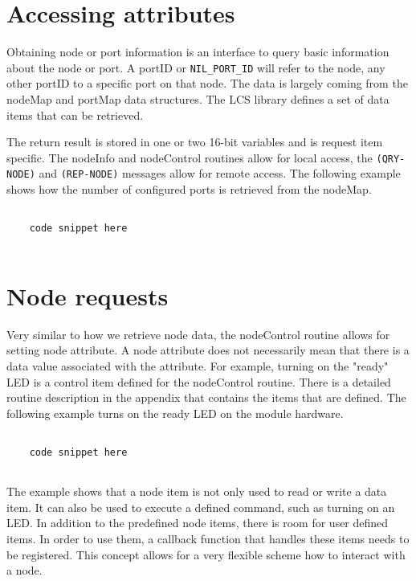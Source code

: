 \section{Accessing attributes}

Obtaining node or port information is an interface to query basic information about the node or port. A portID or \texttt{NIL\_PORT\_ID} will refer to the node, any other portID to a specific port on that node. The data is largely coming from the nodeMap and portMap data structures. The LCS library defines a set of data items that can be retrieved. 

The return result is stored in one or two 16-bit variables and is request item specific. The nodeInfo and nodeControl routines allow for local access, the \texttt{(QRY-NODE)} and \texttt{(REP-NODE)} messages allow for remote access. The following example shows how the number of configured ports is retrieved from the nodeMap.


\lstset{language=c++, style=codesnippetstyle}
\begin{lstlisting}
   
    code snippet here
    
\end{lstlisting}
\FloatBarrier

\section{Node requests}

Very similar to how we retrieve node data, the nodeControl routine allows for setting node attribute. A node attribute does not necessarily mean that there is a data value associated with the attribute. For example, turning on the "ready" LED is a control item defined for the nodeControl routine. There is a detailed routine description in the appendix that contains the items that are defined. The following example turns on the ready LED on the module hardware.

\lstset{language=c++, style=codesnippetstyle}
\begin{lstlisting}
   
    code snippet here
    
\end{lstlisting}
\FloatBarrier

The example shows that a node item is not only used to read or write a data item. It can also be used to execute a defined command, such as turning on an LED. In addition to the predefined node items, there is room for user defined items. In order to use them, a callback function that handles these items needs to be registered. This concept allows for a very flexible scheme how to interact with a node.

